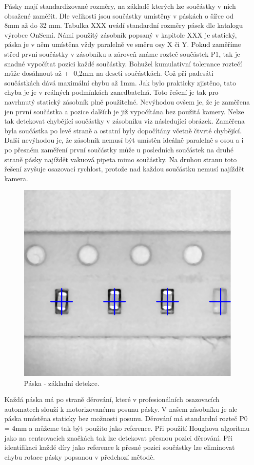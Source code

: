 Pásky mají standardizované rozměry, na základě kterých lze součástky v nich obsažené zaměřit. Dle velikosti jsou součástky umístěny v páskách o šířce od 8mm až do 32 mm. Tabulka XXX uvádí standardní rozměry pásek dle katalogu výrobce OnSemi. 
Námi použitý zásobník popsaný v kapitole XXX je statický, páska je v něm umístěna vždy paralelně ve směru osy X či Y. Pokud zaměříme střed první součástky v zásobníku a zároveň známe rozteč součástek P1, tak je snadné vypočítat pozici každé součástky. Bohužel kumulativní tolerance roztečí může dosáhnout až +- 0,2mm na deseti součástkách. Což při padesáti součástkách dává maximální chybu až 1mm. Jak bylo prakticky zjistěno, tato chyba je je v reálných podmínkách zanedbatelná. Toto řešení je tak pro navrhnutý statický zásobník plně použitelné. Nevýhodou ovšem je, že je zaměřena jen první součástka a pozice dalších je již vypočítána bez použitá kamery.  Nelze tak detekovat chybějící součástky v zásobníku viz následující obrázek. Zaměřena byla součástka po levé straně a ostatní byly dopočítány včetně čtvrté chybějící. Další nevýhodou je, že zásobník nemusí být umístěn ideálně paralelně s osou a i po přesném zaměření první součástky může u posledních součástek na druhé straně pásky najíždět vakuová pipeta mimo součástky. Na druhou stranu toto řešení zvyšuje osazovací rychlost, protože nad každou součástku nemusí najíždět kamera.

\begin{figure}[h!]
  \centering
    \includegraphics[width=0.5\linewidth]{obrazky/res1.png}%
    \caption{Páska - základní detekce.}
    \label{fig:tape2}
\end{figure}

Každá páska má po straně děrování, které v profesionálních osazovacích automatech slouží k motorizovanému posunu pásky. V našem zásobníku je ale páska umístěna staticky bez možnosti posunu. Děrování má standardní rozteč P0 = 4mm a můžeme tak být použito jako reference. Při použití Houghova algoritmu jako na centrovacích značkách tak lze detekovat přesnou pozici děrování. Při identifikaci každé díry jako reference k přesné pozici součástky lze eliminovat chybu rotace pásky popsanou v předchozí mětodě.

